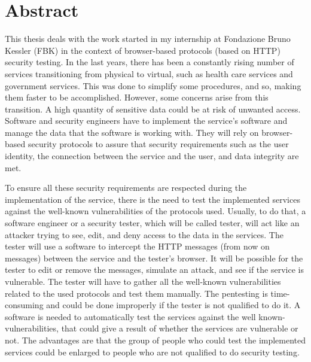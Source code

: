 \chapter*{Abstract} %

This thesis deals with the work started in my internship at Fondazione Bruno Kessler (FBK) in the context of browser-based protocols (based on HTTP) security testing.
In the last years, there has been a constantly rising number of services transitioning from physical to virtual, such as health care services and government services. This was done to simplify some procedures, and so, making them faster to be accomplished. However, some concerns arise from this transition. A high quantity of sensitive data could be at risk of unwanted access. Software and security engineers have to implement the service's software and manage the data that the software is working with. They will rely on browser-based security protocols to assure that security requirements such as the user identity, the connection between the service and the user, and data integrity are met. 

To ensure all these security requirements are respected during the implementation of the service, there is the need to test the implemented services against the well-known vulnerabilities of the protocols used. Usually, to do that, a software engineer or a security tester, which will be called tester, will act like an attacker trying to see, edit, and deny access to the data in the services. The tester will use a software to intercept the HTTP messages (from now on messages) between the service and the tester's browser. It will be possible for the tester to edit or remove the messages, simulate an attack, and see if the service is vulnerable. The tester will have to gather all the well-known vulnerabilities related to the used protocols and test them manually. The pentesting is time-consuming and could be done improperly if the tester is not qualified to do it. A software is needed to automatically test the services against the well known-vulnerabilities, that could give a result of whether the services are vulnerable or not. The advantages are that the group of people who could test the implemented services could be enlarged to people who are not qualified to do security testing.

